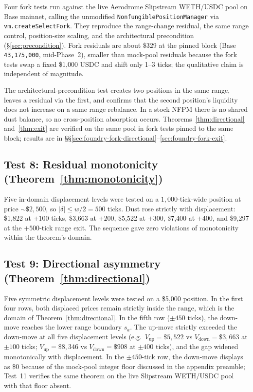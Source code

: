 \documentclass{manuscript}
\begin{document}
Four fork tests run against the live Aerodrome Slipstream WETH/USDC pool on Base mainnet, calling the unmodified \texttt{NonfungiblePositionManager} via \texttt{vm.createSelectFork}. They reproduce the range-change residual, the same range control, position-size scaling, and the architectural precondition (\S\ref{sec:precondition}). Fork residuals are about \$329 at the pinned block (Base \texttt{43{,}175{,}000}, mid-Phase~2), smaller than mock-pool residuals because the fork tests swap a fixed \$1{,}000 USDC and shift only 1--3 ticks; the qualitative claim is independent of magnitude.

The architectural-precondition test creates two positions in the same range, leaves a residual via the first, and confirms that the second position's liquidity does not increase on a same range rebalance. In a stock NFPM there is no shared dust balance, so no cross-position absorption occurs. Theorems~\ref{thm:directional} and~\ref{thm:exit} are verified on the same pool in fork tests pinned to the same block; results are in \S\S\ref{sec:foundry-fork-directional}--\ref{sec:foundry-fork-exit}.

\subsection{Test 8: Residual monotonicity (Theorem~\ref{thm:monotonicity})}\label{sec:foundry-monotonicity}

Five in-domain displacement levels were tested on a $1{,}000$-tick-wide position at price ${\sim}\$2{,}500$, so $|\delta| \leq w/2 = 500$ ticks. Dust rose strictly with displacement: \$1{,}822 at $+100$ ticks, \$3{,}663 at $+200$, \$5{,}522 at $+300$, \$7{,}400 at $+400$, and \$9{,}297 at the $+500$-tick range exit. The sequence gave zero violations of monotonicity within the theorem's domain.

\subsection{Test 9: Directional asymmetry (Theorem~\ref{thm:directional})}\label{sec:foundry-directional}

Five symmetric displacement levels were tested on a \$5{,}000 position. In the first four rows, both displaced prices remain strictly inside the range, which is the domain of Theorem~\ref{thm:directional}. In the fifth row ($\pm 450$ ticks), the down-move reaches the lower range boundary $s_a$. The up-move strictly exceeded the down-move at all five displacement levels (e.g.\ $V_{\text{up}} = \$5{,}522$ vs $V_{\text{down}} = \$3{,}663$ at $\pm 100$ ticks; $V_{\text{up}} = \$8{,}346$ vs $V_{\text{down}} = \$908$ at $\pm 400$ ticks), and the gap widened monotonically with displacement. In the $\pm 450$-tick row, the down-move displays as \$0 because of the mock-pool integer floor discussed in the appendix preamble; Test~11 verifies the same theorem on the live Slipstream WETH/USDC pool with that floor absent.
\end{document}
